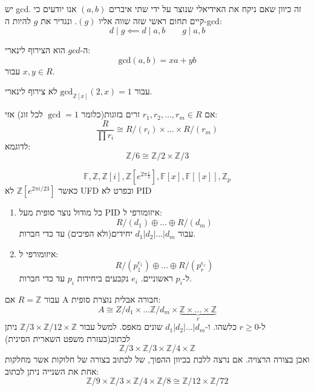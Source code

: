 \documentclass{tstextbook}
\begin{document}
\begin{remark}
יש gcd. זה כיוון שאם ניקח את האידיאלי שנוצר על ידי שתי איברים \((a,b)\) אנו יודעים כי קיים תחום ראשי שזה שווה אליו \((g)\). ונגדיר את \(g\) להיות ה-gcd:
$$d\mid g\impliedby d\mid a,b\qquad g\mid a,b$$

\end{remark}
\begin{proposition}[bezout]
ה-\(gcd\) הוא הצירוף לינארי:
$$\mathrm{gcd}(a,b)=xa+yb$$
עבור \(x,y \in R\).

\end{proposition}
\begin{example}
עבור \(\mathrm{gcd}_{\mathbb{Z}[x]}(2,x)=1\) לא צירוף לינארי.

\end{example}
\begin{proposition}
אם \(r_{1},r_{2},\dots ,r_{m}\in R\) זרים בזוגות(כלומר \(\gcd=1\) לכל זוג) אזי:
$$\frac{R}{\prod r_{i}}\cong R / (r_{i})\times \dots \times R / (r_{m})$$
לדוגמא:
$$\mathbb{Z} / 6 \cong  \mathbb{Z} / 2 \times \mathbb{Z} / 3$$

\end{proposition}
\begin{example}[PID]
$$\mathbb{F} ,\mathbb{Z},\mathbb{Z}[i], \mathbb{Z}[e^{2\pi \frac{i}{3}}],\mathbb{F} [x], \mathbb{F}[[x]], \mathbb{Z}_{p}  $$
כאשר \(\mathbb{Z}[e^{ 2\pi i/23 }]\) לא UFD ובפרט לא PID

\end{example}
\begin{proposition}
  \begin{enumerate}
    \item כל מודול נוצר סופית מעל PID איזומורפי ל: 
$$R / (d_{1}) \oplus \dots \oplus R / (d_{m})$$
עבור \(d_{1}|d_{2}|\dots|d_{m}\) יחידים(ולא הפיכים) עד כדי חברות.


    \item איזומורפי ל: 
$$R / (p_{1}^{e_{1}})\oplus\dots \oplus R / (p_{r}^{e_{r}})$$
ל-\(p_{i}\) ראשוניים. \(e_{i}\) נקבעים ביחידות \(p_{i}\) עד כדי חברות.


  \end{enumerate}
\end{proposition}
\begin{example}
עבור \(R=\mathbb{Z}\) אם A חבורה אבלית נוצרת סופית:
$$A\cong  Z / d_{1} \times \dots \mathbb{Z} / d_{m} \times \underbrace{ \mathbb{Z} \times \dots\times\mathbb{Z} }_{ r } $$
ל-\(r\geq 0\) כלשהו. ו-\(d_{1}|d_{2}|\dots|d_{m}\) שונים מאפס. למשל עבור \(\mathbb{Z} / 3 \times \mathbb{Z} / 12 \times \mathbb{Z}\) ניתן לכתוב(בעזרת משפט השארית הסינית)
$$\mathbb{Z} / 3 \times \mathbb{Z} / 3 \times \mathbb{Z} / 4 \times \mathbb{Z}$$
ואכן בצורה הרצויה. אם נרצה ללכת בכיוון ההפוך, של לכתוב בצורה של חלוקות אשר מחלקות אחת את השנייה ניתן לכתוב:
$$\mathbb{Z} / 9 \times \mathbb{Z} / 3 \times \mathbb{Z} / 4 \times \mathbb{Z} / 8 \cong  \mathbb{Z} / 12 \times \mathbb{Z} / 72$$

\end{example}
\end{document}
